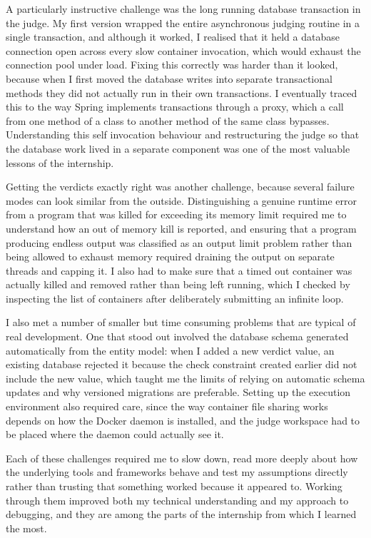 \documentclass[12pt,a4paper]{report}
\begin{document}
A particularly instructive challenge was the long running database transaction in the judge. My first version wrapped the entire asynchronous judging routine in a single transaction, and although it worked, I realised that it held a database connection open across every slow container invocation, which would exhaust the connection pool under load. Fixing this correctly was harder than it looked, because when I first moved the database writes into separate transactional methods they did not actually run in their own transactions. I eventually traced this to the way Spring implements transactions through a proxy, which a call from one method of a class to another method of the same class bypasses. Understanding this self invocation behaviour and restructuring the judge so that the database work lived in a separate component was one of the most valuable lessons of the internship.

Getting the verdicts exactly right was another challenge, because several failure modes can look similar from the outside. Distinguishing a genuine runtime error from a program that was killed for exceeding its memory limit required me to understand how an out of memory kill is reported, and ensuring that a program producing endless output was classified as an output limit problem rather than being allowed to exhaust memory required draining the output on separate threads and capping it. I also had to make sure that a timed out container was actually killed and removed rather than being left running, which I checked by inspecting the list of containers after deliberately submitting an infinite loop.

I also met a number of smaller but time consuming problems that are typical of real development. One that stood out involved the database schema generated automatically from the entity model: when I added a new verdict value, an existing database rejected it because the check constraint created earlier did not include the new value, which taught me the limits of relying on automatic schema updates and why versioned migrations are preferable. Setting up the execution environment also required care, since the way container file sharing works depends on how the Docker daemon is installed, and the judge workspace had to be placed where the daemon could actually see it.

Each of these challenges required me to slow down, read more deeply about how the underlying tools and frameworks behave and test my assumptions directly rather than trusting that something worked because it appeared to. Working through them improved both my technical understanding and my approach to debugging, and they are among the parts of the internship from which I learned the most.
\end{document}
